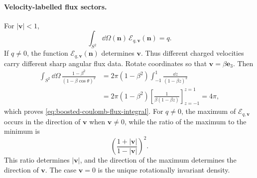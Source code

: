 \paragraph{Velocity-labelled flux sectors.}
For \(|\mathbf v|<1\),
\begin{equation}
  \int_{S^2}\dd\Omega(\mathbf n)\,
  \mathcal E_{q,\mathbf v}(\mathbf n)
  =
  q .
  \label{eq:boosted-coulomb-flux-integral}
\end{equation}
If \(q\ne0\), the function
\(\mathcal E_{q,\mathbf v}(\mathbf n)\) determines \(\mathbf v\).  Thus
different charged velocities carry different sharp angular flux data.
Rotate coordinates so that \(\mathbf v=\beta\mathbf e_3\).  Then
\[
\begin{aligned}
  \int_{S^2}\dd\Omega\,
  \frac{1-\beta^2}{(1-\beta\cos\theta)^2}
  &=
  2\pi(1-\beta^2)
  \int_{-1}^{1}\frac{\dd z}{(1-\beta z)^2}
  \\
  &=
  2\pi(1-\beta^2)
  \left[\frac{1}{\beta(1-\beta z)}\right]_{z=-1}^{z=1}
  =
  4\pi ,
\end{aligned}
\]
which proves \eqref{eq:boosted-coulomb-flux-integral}.  For \(q\ne0\), the
maximum of \(\mathcal E_{q,\mathbf v}\) occurs in the direction of
\(\mathbf v\) when \(\mathbf v\ne0\), while the ratio of the maximum to the
minimum is
\[
  \left(\frac{1+|\mathbf v|}{1-|\mathbf v|}\right)^2 .
\]
This ratio determines \(|\mathbf v|\), and the direction of the maximum
determines the direction of \(\mathbf v\).  The case \(\mathbf v=0\) is the
unique rotationally invariant density.


